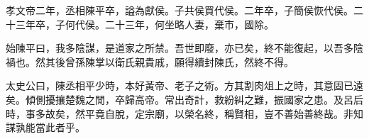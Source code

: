 孝文帝二年，丞相陳平卒，謚為獻侯。子共侯買代侯。二年卒，子簡侯恢代侯。二十三年卒，子何代侯。二十三年，何坐略人妻，棄市，國除。

始陳平曰，我多陰謀，是道家之所禁。吾世即廢，亦已矣，終不能復起，以吾多陰禍也。然其後曾孫陳掌以衛氏親貴戚，願得續封陳氏，然終不得。

太史公曰，陳丞相平少時，本好黃帝、老子之術。方其割肉俎上之時，其意固已遠矣。傾側擾攘楚魏之閒，卒歸高帝。常出奇計，救紛糾之難，振國家之患。及呂后時，事多故矣，然平竟自脫，定宗廟，以榮名終，稱賢相，豈不善始善終哉。非知謀孰能當此者乎。